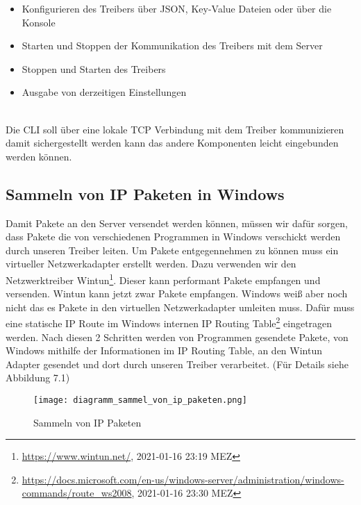 \newline
\begin{itemize}
    \item Konfigurieren des Treibers über JSON, Key-Value Dateien oder über die Konsole
    \item Starten und Stoppen der Kommunikation des Treibers mit dem Server
    \item Stoppen und Starten des Treibers
    \item Ausgabe von derzeitigen Einstellungen
\end{itemize}
\ \\
Die CLI soll über eine lokale TCP Verbindung mit dem Treiber kommunizieren damit sichergestellt werden kann das andere Komponenten leicht eingebunden werden können.


\subsection{Sammeln von IP Paketen in Windows}
Damit Pakete an den Server versendet werden können, müssen wir dafür sorgen, dass Pakete die von verschiedenen Programmen in Windows verschickt werden durch unseren Treiber leiten. Um Pakete entgegennehmen zu können muss ein virtueller Netzwerkadapter erstellt werden. Dazu verwenden wir den Netzwerktreiber Wintun\footnote[1]{\url{https://www.wintun.net/}, 2021-01-16 23:19 MEZ}. Dieser kann performant Pakete empfangen und versenden.
\newline
\newline
Wintun kann jetzt zwar Pakete empfangen. Windows weiß aber noch nicht das es Pakete in den virtuellen Netzwerkadapter umleiten muss. Dafür muss eine statische IP Route im Windows internen IP Routing Table\footnote[2]{\url{https://docs.microsoft.com/en-us/windows-server/administration/windows-commands/route_ws2008}, 2021-01-16 23:30 MEZ} eingetragen werden.
\newline
\newline
Nach diesen 2 Schritten werden von Programmen gesendete Pakete, von Windows mithilfe  der Informationen im IP Routing Table, an den Wintun Adapter gesendet und dort durch unseren Treiber verarbeitet. (Für Details siehe Abbildung 7.1)
\begin{figure}[H]
    \centering
    \texttt{[image: diagramm\_sammel\_von\_ip\_paketen.png]}
    \caption[Sammeln von IP Paketen]{Sammeln von IP Paketen} 
\end{figure}
\newpage


